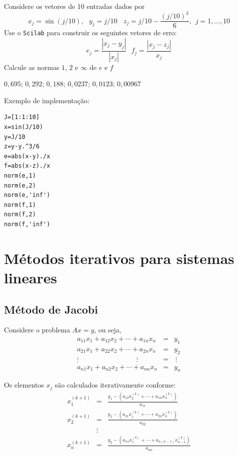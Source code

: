 \begin{Exercise} Considere os vetores de 10 entradas dados por $$x_j=\sin(j/10),~~~y_j=j/10~~~~z_j=j/10-\frac{\left(j/10\right)^3}{6},~~ j=1,\ldots,10$$
Use o \verb+Scilab+ para construir os seguintes vetores de erro:
$$e_{j}=\frac{|x_j-y_j|}{|x_j|}~~~ f_j=\frac{|x_j-z_j|}{x_j}$$
Calcule as normas $1$, $2$ e $\infty$ de $e$ e $f$
\end{Exercise}
\begin{Answer}
  \begin{tiny}
$0,695$; $0,292$; $0,188$;  $0,0237$; $0,0123$; $0,00967$

\ifisscilab
Exemplo de implementação:
\begin{verbatim}
J=[1:1:10]
x=sin(J/10)
y=J/10
z=y-y.^3/6
e=abs(x-y)./x
f=abs(x-z)./x
norm(e,1)
norm(e,2)
norm(e,'inf')
norm(f,1)
norm(f,2)
norm(f,'inf')
\end{verbatim}
\fi    
  \end{tiny}
\end{Answer}



\section{Métodos iterativos para sistemas lineares}

\subsection{Método de Jacobi}

Considere o problema $Ax=y$, ou seja,
\begin{eqnarray*}
a_{11}x_1+a_{12}x_2+\cdots+a_{1n}x_n&=&y_1\\
a_{21}x_1+a_{22}x_2+\cdots+a_{2n}x_n&=&y_2\\
\vdots \hspace{100pt}\vdots~~~~&=&~\vdots\\
a_{n1}x_1+a_{n2}x_2+\cdots+a_{nn}x_n&=&y_n
\end{eqnarray*}

Os elementos $x_j$ são calculados iterativamente conforme:
\begin{eqnarray*}
x_1^{(k+1)}&=& \frac{y_1 - \left(a_{12}x_2^{(k)}+\cdots+a_{1n}x_n^{(k)}\right)}{a_{11}}\\
x_2^{(k+1)}&=&\frac{y_2 - \left(a_{21}x_1^{(k)}+\cdots+a_{2n}x_n^{(k)}\right)}{a_{22}}\\
&\vdots&\\
x_n^{(k+1)}&=&\frac{y_2 - \left(a_{n1}x_1^{(k)}+\cdots+a_{n(n-1)}x_{n-1}^{(k)}\right)}{a_{nn}}
\end{eqnarray*}


